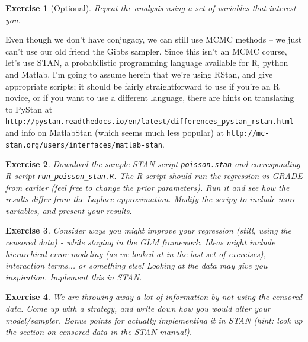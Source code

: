 \documentclass[twoside]{article}
\newcounter{lecnum}
\newtheorem{exercise}{Exercise}[lecnum]
\begin{document}
  \begin{exercise}[Optional]
    Repeat the analysis using a set of variables that interest you.
  \end{exercise}


      Even though we don't have conjugacy, we can still use MCMC methods -- we just can't use our old friend the Gibbs sampler. Since this isn't an MCMC course, let's use STAN, a probabilistic programming language available for R, python and Matlab. I'm going to assume herein that we're using RStan, and give appropriate scripts; it should be fairly straightforward to use if you're an R novice, or if you want to use a different language, there are hints on translating to PyStan at \texttt{http://pystan.readthedocs.io/en/latest/differences\_pystan\_rstan.html} and info on MatlabStan (which seems much less popular) at \texttt{http://mc-stan.org/users/interfaces/matlab-stan}.
  \begin{exercise}
    Download the sample STAN script \texttt{poisson.stan} and corresponding R script \texttt{run\_poisson\_stan.R}. The R script should run the  regression vs GRADE from earlier (feel free to change the prior parameters). Run it and see how the results differ from the Laplace approximation. Modify the scripy to include more variables, and present your results.
  \end{exercise}

  
  \begin{exercise}
    Consider ways you might improve your regression (still, using the censored data) - while staying in the GLM framework.  Ideas might include hierarchical error modeling (as we looked at in the last set of exercises), interaction terms... or something else! Looking at the data may give you inspiration. Implement this in STAN.
  \end{exercise}
    
  
  \begin{exercise}
    We are throwing away a lot of information by not using the censored data. Come up with a strategy, and write down how you would alter your model/sampler. Bonus points for actually implementing it in STAN (hint: look up the section on censored data in the STAN manual).
  \end{exercise}

  
  
\end{document}

